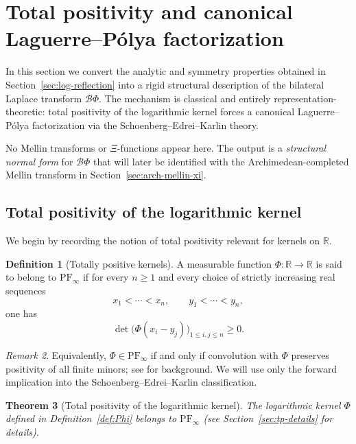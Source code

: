 \documentclass[12pt]{amsart}
\newtheorem{theorem}{Theorem}[section]
\theoremstyle{definition}
\newtheorem{definition}[theorem]{Definition}
\theoremstyle{remark}
\newtheorem{remark}[theorem]{Remark}
\begin{document}

\section{Total positivity and canonical Laguerre--Pólya factorization}
\label{sec:total-positivity}

In this section we convert the analytic and symmetry properties obtained in
Section~\ref{sec:log-reflection} into a rigid structural description of the
bilateral Laplace transform $\mathcal B\Phi$. The mechanism is classical and
entirely representation-theoretic: total positivity of the logarithmic kernel
forces a canonical Laguerre--Pólya factorization via the
Schoenberg--Edrei--Karlin theory.

No Mellin transforms or $\Xi$-functions appear here. The output is a
\emph{structural normal form} for $\mathcal B\Phi$ that will later be identified
with the Archimedean-completed Mellin transform in Section~\ref{sec:arch-mellin-xi}.

\subsection{Total positivity of the logarithmic kernel}

We begin by recording the notion of total positivity relevant for kernels on
$\mathbb R$.

\begin{definition}[Totally positive kernels]
A measurable function $\Phi:\mathbb R\to\mathbb R$ is said to belong to
$\mathrm{PF}_\infty$ if for every $n\ge1$ and every choice of strictly increasing
real sequences
\[
x_1<\cdots<x_n,
\qquad
y_1<\cdots<y_n,
\]
one has
\[
\det\!\big(\Phi(x_i-y_j)\big)_{1\le i,j\le n}\ge 0.
\]
\end{definition}

\begin{remark}
Equivalently, $\Phi\in\mathrm{PF}_\infty$ if and only if convolution with $\Phi$
preserves positivity of all finite minors; see \cite{karlin1968total} for
background. We will use only the forward implication into the
Schoenberg--Edrei--Karlin classification.
\end{remark}

\begin{theorem}[Total positivity of the logarithmic kernel]
\label{thm:Phi-PF}
The logarithmic kernel $\Phi$ defined in
Definition~\ref{def:Phi} belongs to $\mathrm{PF}_\infty$ (see Section~\ref{sec:tp-details} for details).
\end{theorem}
\end{document}
